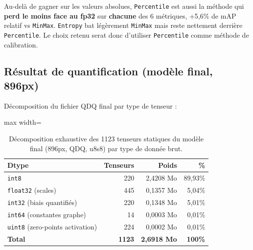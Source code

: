 \documentclass[11pt,a4paper]{article}
\let\Oldsubsection\subsection
\renewcommand{\subsection}{\FloatBarrier\Oldsubsection}
\begin{document}
    Au-delà de gagner sur les valeurs absolues, \texttt{Percentile} est
    aussi la méthode qui \textbf{perd le moins face au fp32} sur
    \textbf{chacune} des 6 métriques,
    +5,6\% de mAP relatif vs \texttt{MinMax}.
    \texttt{Entropy} bat légèrement \texttt{MinMax} mais reste nettement
    derrière \texttt{Percentile}. Le choix retenu serat donc d'utiliser \texttt{Percentile} comme méthode de calibration.
    
    \subsection{Résultat de quantification (modèle final, 896px)}
    
    Décomposition du fichier QDQ final par type de tenseur :
    
    \begin{table}[!htbp]
    \centering
    \begin{adjustbox}{max width=\linewidth}
    \begin{tabular}{@{}lrrr@{}}
    \toprule
    \textbf{Dtype} & \textbf{Tenseurs} & \textbf{Poids} & \textbf{\%} \\
    \midrule
    \texttt{int8}  & 220 & 2,4208 Mo & 89,93\% \\
    \texttt{float32} (scales)        & 445 & 0,1357 Mo &  5,04\% \\
    \texttt{int32} (biais quantifiés) & 220 & 0,1348 Mo &  5,01\% \\
    \texttt{int64} (constantes graphe) & 14 & 0,0003 Mo &  0,01\% \\
    \texttt{uint8} (zero-points activation) & 224 & 0,0002 Mo &  0,01\% \\
    \midrule
    \textbf{Total} & \textbf{1123} & \textbf{2,6918 Mo} & \textbf{100\%} \\
    \bottomrule
    \end{tabular}
    \end{adjustbox}
    \caption{Décomposition exhaustive des 1123 tenseurs statiques du modèle final (896px, QDQ, u8s8) par type de donnée brut.}
    \label{tab:dtype-breakdown}
    \end{table}
    
\end{document}
